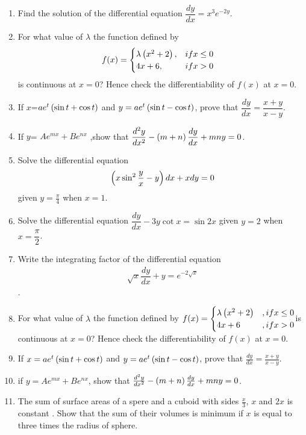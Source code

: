 \begin{enumerate}

\item Find the solution of the differential equation $\dfrac{dy}{dx} = x^{3}e^{-2y}$.\\

\item For what value of $\lambda$ the function defined by 
\begin{align*} f(x) &= \begin{cases}\lambda\left(x^2 +2\right),&if x\leq0 \\ 4x+6 , &if x>0 \end{cases} \end{align*}
is continuous at $x=0$? Hence check the differentiability of $f(x)$ at $x=0$.\\

\item If $x$=$ae^t\left(\sin{t}+\cos{t}\right)$ and $y=ae^t \left(\sin{t}-\cos{t}\right)$, prove that $\dfrac{dy}{dx} = \dfrac{x+y}{x-y}$.\\

\item If $y$= $Ae^{mx}+Be^{nx}$ ,show that $\dfrac{d^2 y}{dx^2}-\left(m+n\right)\dfrac{dy}{dx} + mny = 0$.\\

\item Solve the differential equation 
\begin{align*}
\left(x \sin^2{\frac{y}{x}}-y\right)dx + xdy =0
\end{align*}
given $y = \frac{\pi}{4}$ when $x=1$.\\

\item Solve the differential equation $\dfrac{dy}{dx}- 3y\cot{x} = \sin{2x}$ given $y=2$ when $x=\dfrac{\pi}{2}$.\\

\item Write the integrating factor of the differential equation 
\begin{align*}
\sqrt{x}\dfrac{dy}{dx}+y = e^{-2\sqrt{x}}
\end{align*}.
\item For what value of $\lambda$ the function defined by $f(x) = \begin{cases} \lambda\left(x^2+2\right)&, if x \leq 0 \\ 4x+6&, if x>0 \end{cases}$is continuous at $x=0$? Hence check the differentiability of $f(x)$ at $x=0$. 

\item If $x = ae^t\left(\sin{t}+\cos{t}\right)$ and $y = ae^t\left(\sin{t}-\cos{t}\right)$, prove that $\frac{dy}{dx}=\frac{x+y}{x-y}$. 

\item if $y = Ae^{mx} + Be^{nx}$, show that $\frac{d^{2}y}{dx^2} -\left(m+n\right)\frac{dy}{dx} + mny = 0$. 

\item The sum of surface areas of a spere and a cuboid with sides $\frac{x}{3}$, $x$ and $2x$ is constant . Show that the sum of their volumes is minimum if $x$ is equal to three times the radius of sphere.
\end{enumerate}
